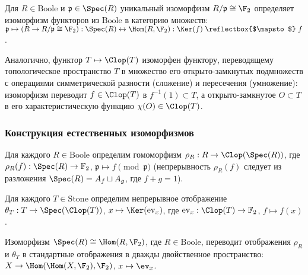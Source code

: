 \documentclass[
	extrafontsizes,
	11pt,
	hyphens,
]{memoir}
\begin{document}
\begin{remark}
Для $R \in \mathrm{Boole}$ и $\mathfrak{p} \in \Spec(R)$ уникальный изоморфизм $R/\mathfrak{p} \cong \F_2$ определяет изоморфизм функторов из \(\mathrm{Boole}\) в категорию множеств:
\(
    \mathfrak{p} \mapsto (R \to R/\mathfrak{p} \cong \F_2) : \Spec(R)
    \leftrightarrow
    \Hom(R,\F_2) : \Ker(f) \mathrel{\reflectbox{$\mapsto$}} f
\).
\end{remark}

\begin{remark}
Аналогично, функтор $T \mapsto \Clop(T)$ {изоморфен} функтору, переводящему топологическое пространство $T$ в множество его открыто-зам\-кну\-тых подмножеств с операциями симметрической разности (сложение) и пересечения (умножение): изоморфизм переводит $f \in \Clop(T)$ в $f^{-1}(1) \subset T$, а открыто-замкнутое $O \subset T$ в его характеристическую функцию $\chi(O) \in \Clop(T)$.
\end{remark}

\subsubsection{Конструкция естественных изоморфизмов}

\begin{definition}
Для каждого $R \in \mathrm{Boole}$ определим гомоморфизм $\rho_R : R \to \Clop(\Spec(R))$, где $\rho_R(f) : \Spec(R) \to \mathbb{F}_2$, $\mathfrak{p} \mapsto f \pmod{\mathfrak{p}}$ (непрерывность $\rho_R(f)$ следует из разложения $\Spec(R) = A_f \sqcup A_g$, где $f+g=1$).
\end{definition}

\begin{definition}
Для каждого $T \in \mathrm{Stone}$ определим непрерывное отображение $\theta_T : T \to \Spec(\Clop(T))$, $x \mapsto \Ker(\mathrm{ev}_x)$, где $\mathrm{ev}_x : \Clop(T) \to \mathbb{F}_2$, $f \mapsto f(x)$.
\end{definition}

\begin{remark}%
Изоморфизм
\(
\Spec(R) \cong \Hom(R,\F_2)
\),
где $R \in \mathrm{Boole}$, переводит
отображения $\rho_R$ и $\theta_T$ в стандартные отображения в дважды двойственное пространство:
\(X \to \Hom(\Hom(X,\F_2),\F_2)\),
\(x \mapsto \ev_x\).
\end{remark}
\end{document}
